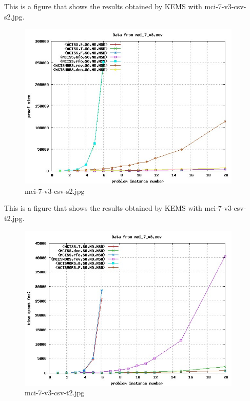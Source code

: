 This is a figure that shows the results obtained by KEMS with mci-7-v3-csv-s2.jpg.
\begin{figure}[htbp]
\begin{center}
\includegraphics[width=0.95\textwidth]{figuras/mci-7-v3-csv-s2.jpg}
\end{center}
\caption{mci-7-v3-csv-s2.jpg}
\end{figure}

This is a figure that shows the results obtained by KEMS with mci-7-v3-csv-t2.jpg.
\begin{figure}[htbp]
\begin{center}
\includegraphics[width=0.95\textwidth]{figuras/mci-7-v3-csv-t2.jpg}
\end{center}
\caption{mci-7-v3-csv-t2.jpg}
\end{figure}

